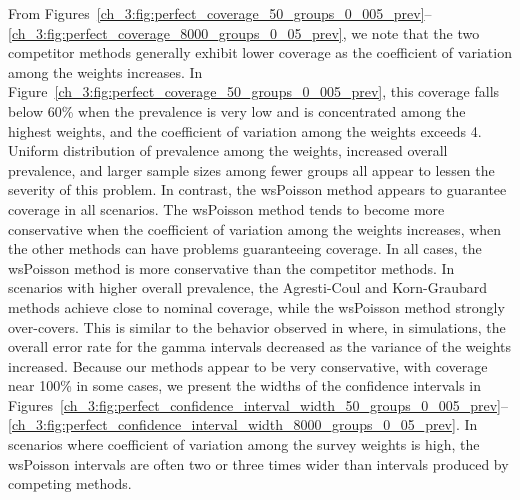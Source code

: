 From Figures~\ref{ch_3:fig:perfect_coverage_50_groups_0_005_prev}--\ref{ch_3:fig:perfect_coverage_8000_groups_0_05_prev}, we note that the two competitor methods generally exhibit lower coverage as the coefficient of variation among the weights increases.
In Figure~\ref{ch_3:fig:perfect_coverage_50_groups_0_005_prev}, this coverage falls below 60\% when the prevalence is very low and is concentrated among the highest weights, and the coefficient of variation among the weights exceeds 4.
Uniform distribution of prevalence among the weights, increased overall prevalence, and larger sample sizes among fewer groups all appear to lessen the severity of this problem.
In contrast, the wsPoisson method appears to guarantee coverage in all scenarios.
The wsPoisson method tends to become more conservative when the coefficient of variation among the weights increases, when the other methods can have problems guaranteeing coverage.
In all cases, the wsPoisson method is more conservative than the competitor methods.
In scenarios with higher overall prevalence, the Agresti-Coul and Korn-Graubard methods achieve close to nominal coverage, while the wsPoisson method strongly over-covers.
This is similar to the behavior observed in \citep{FayF:1997} where, in simulations, the overall error rate for the gamma intervals decreased as the variance of the weights increased.
Because our methods appear to be very conservative, with coverage near 100\% in some cases, we present the widths of the confidence intervals in Figures~\ref{ch_3:fig:perfect_confidence_interval_width_50_groups_0_005_prev}--\ref{ch_3:fig:perfect_confidence_interval_width_8000_groups_0_05_prev}.
In scenarios where coefficient of variation among the survey weights is high, the wsPoisson intervals are often two or three times wider than intervals produced by competing methods.


